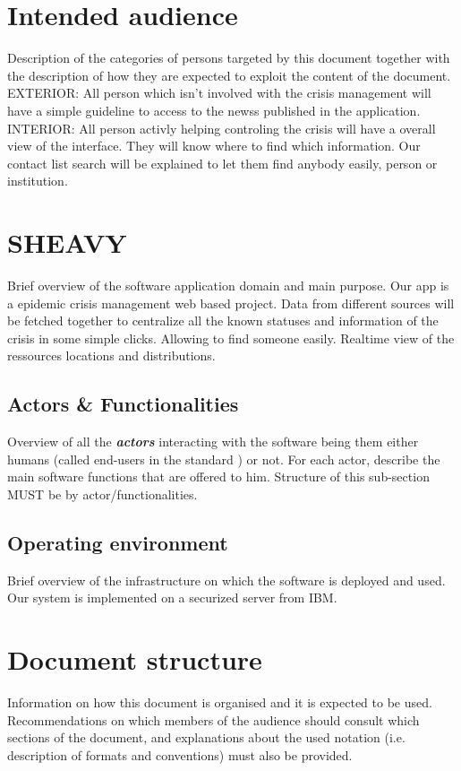 \section{Intended audience}
Description of the categories of persons targeted by this document together with the description of how they are expected to exploit the content of the document.
EXTERIOR: All person which isn't involved with the crisis management will have a
simple guideline to access to the newss published in the application.
INTERIOR: All person activly helping controling the crisis will have a overall
view of the interface. They will know where to find which information. Our
contact list search will be explained to let them find anybody easily, person or
institution.

\section{SHEAVY}
Brief overview of the software application domain and main purpose.
Our app is a epidemic crisis management web based project. Data from different
sources will be fetched together to centralize all the known statuses and
information of the crisis in some simple clicks. Allowing to find someone
easily. Realtime view of the ressources locations and distributions.

\subsection{Actors \& Functionalities}
Overview of all the \textbf{\emph{\glspl{actor}}} interacting with the software
being them either humans (called end-users in the standard
\cite{IEEE-2001-userdocumentation}) or not. For each actor, describe the main
software functions that are offered to him. Structure of this sub-section MUST
be by actor/functionalities.


\subsection{Operating environment}
Brief overview of the infrastructure on which the software is deployed and used.
Our system is implemented on a securized server from IBM.

\section{Document structure}  
Information on how this document is organised and it is expected to be
used. Recommendations on which members of the audience
should consult which sections of the document, and explanations about the used
notation (i.e. description of formats and conventions) must also be provided.





\glsaddall
\printglossaries

